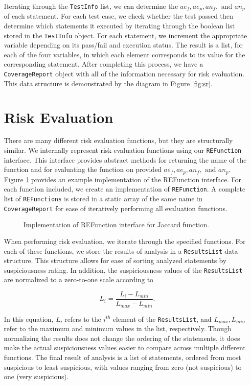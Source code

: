 Iterating through the \texttt{TestInfo} list, we can determine the $ae_f, ae_p, an_f, \text{ and } an_p$
of each statement.  For each test case, we check whether the test passed then determine which statements
it executed by iterating through the boolean list stored in the \texttt{TestInfo} object.  For each
statement, we increment the appropriate variable depending on its pass/fail and execution status.  The
result is a list, for each of the four variables, in which each element corresponds to its value for
the corresponding statement.  After completing this process, we have a \texttt{CoverageReport} object
with all of the information necessary for risk evaluation.  This data structure is demonstrated by the 
diagram in Figure \ref{fig:sr}.

\section{Risk Evaluation} \label{sec:re}

There are many different risk evaluation functions, but they are structurally similar.  We internally
represent risk evaluation functions using our \texttt{REFunction} interface.  This interface provides
abstract methods for returning the name of the function and for evaluating the function on provided
$ae_f, ae_p, an_f, \text{ and } an_p$.  Figure \ref{fig:re} provides an example implementation of
the REFunction interface.  For each function included, we create an implementation of
\texttt{REFunction}.  A complete list of \texttt{REFunctions} is stored in a static array of the
same name in \texttt{CoverageReport} for ease of iteratively performing all evaluation functions.  

\begin{figure}[tb]
\centering

\caption{Implementation of REFunction interface for Jaccard function.}
\label{fig:re}
\end{figure}

When performing risk evaluation, we iterate through the specified functions.  For each of these
functions, we store the results of analysis in a \texttt{ResultsList} data structure.  This
structure allows for ease of sorting analyzed statements by suspiciousness rating.  In addition, the
suspiciousness values of the \texttt{ResultsList} are normalized to a zero-to-one scale according to

\[ L_i = \frac{ L_i - L_{min} }{ L_{max} - L_{min} }. \]

In this equation, $L_i$ refers to the $i^{th}$ element of the \texttt{ResultsList}, and $L_{max}, L_{min}$ refer to the maximum and minimum values in the list, respectively.  Though normalizing the results does
not change the ordering of the statements, it does make the actual suspiciousness values easier to compare
across multiple different functions.  The final result of analysis is a list of statements, ordered from
most suspicious to least suspicious, with values ranging from zero (not suspicious) to one (very 
suspicious).

